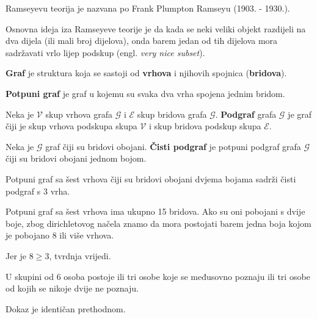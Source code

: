 Ramseyevu teorija je nazvana po Frank Plumpton Ramseyu (1903. - 1930.).

Osnovna ideja iza Ramseyeve teorije je da kada se neki veliki objekt razdijeli
na dva dijela (ili mali broj dijelova), onda barem jedan od tih dijelova mora
sadržavati vrlo lijep podskup (engl. \textit{very nice subset}).

\begin{definition}[graf]
    \textbf{Graf} je struktura koja se sastoji od \textbf{vrhova} i njihovih
    spojnica (\textbf{bridova}).
\end{definition}

\begin{definition}
    \textbf{Potpuni graf} je graf u kojemu su svaka dva vrha spojena jednim
    bridom.
\end{definition}

\begin{definition}[podgraf]
    Neka je $\mathcal{V}$ skup vrhova grafa $\mathcal{G}$ i $\mathcal{E}$ skup
    bridova grafa $\mathcal{G}$. \textbf{Podgraf} grafa $\mathcal{G}$ je graf
    čiji je skup vrhova podskupa skupa $\mathcal{V}$ i skup bridova podskup
    skupa $\mathcal{E}$.
\end{definition}

\begin{definition}
    Neka je $\mathcal{G}$ graf čiji su bridovi obojani. \textbf{Čisti podgraf}
    je potpuni podgraf grafa $\mathcal{G}$ čiji su bridovi obojani jednom bojom.
\end{definition}

\begin{problem}
    Potpuni graf sa šest vrhova čiji su bridovi obojani dvjema bojama sadrži
    čisti podgraf s 3 vrha.
\end{problem}

Potpuni graf sa šest vrhova ima ukupno 15 bridova. Ako su oni pobojani s dvije
boje, zbog dirichletovog načela znamo da mora postojati barem jedna boja kojom
je pobojano 8 ili više vrhova.

Jer je $8 \geq 3$, tvrdnja vrijedi.

\begin{problem}
    U skupini od 6 osoba postoje ili tri osobe koje se međusovno poznaju ili tri
    osobe od kojih se nikoje dvije ne poznaju.
\end{problem}

Dokaz je identičan prethodnom.
